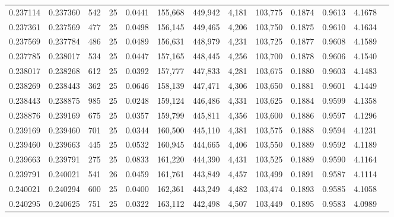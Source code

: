 \begin{tabular}{rrrrrrrrrrrrr}
0.237114 & 0.237360 &   542 &  25 &                                     0.0441 & 155,668 & 449,942 &   4,181 & 103,775 & 0.1874 & 0.9613 & 4.1678 \\
0.237361 & 0.237569 &   477 &  25 &                                     0.0498 & 156,145 & 449,465 &   4,206 & 103,750 & 0.1875 & 0.9610 & 4.1634 \\
0.237569 & 0.237784 &   486 &  25 &                                     0.0489 & 156,631 & 448,979 &   4,231 & 103,725 & 0.1877 & 0.9608 & 4.1589 \\
0.237785 & 0.238017 &   534 &  25 &                                     0.0447 & 157,165 & 448,445 &   4,256 & 103,700 & 0.1878 & 0.9606 & 4.1540 \\
0.238017 & 0.238268 &   612 &  25 &                                     0.0392 & 157,777 & 447,833 &   4,281 & 103,675 & 0.1880 & 0.9603 & 4.1483 \\
0.238269 & 0.238443 &   362 &  25 &                                     0.0646 & 158,139 & 447,471 &   4,306 & 103,650 & 0.1881 & 0.9601 & 4.1449 \\
0.238443 & 0.238875 &   985 &  25 &                                     0.0248 & 159,124 & 446,486 &   4,331 & 103,625 & 0.1884 & 0.9599 & 4.1358 \\
0.238876 & 0.239169 &   675 &  25 &                                     0.0357 & 159,799 & 445,811 &   4,356 & 103,600 & 0.1886 & 0.9597 & 4.1296 \\
0.239169 & 0.239460 &   701 &  25 &                                     0.0344 & 160,500 & 445,110 &   4,381 & 103,575 & 0.1888 & 0.9594 & 4.1231 \\
0.239460 & 0.239663 &   445 &  25 &                                     0.0532 & 160,945 & 444,665 &   4,406 & 103,550 & 0.1889 & 0.9592 & 4.1189 \\
0.239663 & 0.239791 &   275 &  25 &                                     0.0833 & 161,220 & 444,390 &   4,431 & 103,525 & 0.1889 & 0.9590 & 4.1164 \\
0.239791 & 0.240021 &   541 &  26 &                                     0.0459 & 161,761 & 443,849 &   4,457 & 103,499 & 0.1891 & 0.9587 & 4.1114 \\
0.240021 & 0.240294 &   600 &  25 &                                     0.0400 & 162,361 & 443,249 &   4,482 & 103,474 & 0.1893 & 0.9585 & 4.1058 \\
0.240295 & 0.240625 &   751 &  25 &                                     0.0322 & 163,112 & 442,498 &   4,507 & 103,449 & 0.1895 & 0.9583 & 4.0989 \\

\end{tabular}
